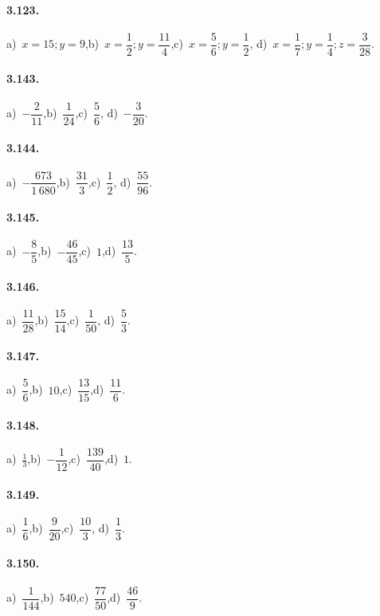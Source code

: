 \begin{multicols}{2}
\paragraph{3.123.}
a)~$x=15; y=9$,\quad b)~$x=\dfrac{1}{2}; y=\dfrac{11}{4}$,\quad c)~$x=\dfrac{5}{6}; %
y=\dfrac{1}{2}$,\quad %
d)~$x=\dfrac{1}{7}; y=\dfrac{1}{4}; z=\dfrac{3}{28}$.

\paragraph{3.143.}
a)~$-\dfrac{2}{11}$,\quad b)~$\dfrac{1}{24}$,\quad c)~$\dfrac{5}{6}$,%
\quad d)~$-\dfrac{3}{20}$.

\paragraph{3.144.}
a)~$-\dfrac{673}{1\,680}$,\quad b)~$\dfrac{31}{3}$,\quad c)~$\dfrac{1}{2}$,%
\quad d)~$\dfrac{55}{96}$.

\paragraph{3.145.}
a)~$-\dfrac{8}{5}$,\quad b)~$-\dfrac{46}{45}$,\quad c)~$1$,\quad d)~$\dfrac{13}{5}$.

\paragraph{3.146.}
a)~$\dfrac{11}{28}$,\quad b)~$\dfrac{15}{14}$,\quad c)~$\dfrac{1}{50}$,\quad %
d)~$\dfrac{5}{3}$.

\paragraph{3.147.}
a)~$\dfrac{5}{6}$,\quad b)~$10$,\quad c)~$\dfrac{13}{15}$,\quad d)~$\dfrac{11}{6}$.

\paragraph{3.148.}
a)~$\frac{1}{3}$,\quad b)~$-\dfrac{1}{12}$,\quad c)~$\dfrac{139}{40}$,\quad d)~$1$.

\paragraph{3.149.}
a)~$\dfrac{1}{6}$,\quad b)~$\dfrac{9}{20}$,\quad c)~$\dfrac{10}{3}$,\quad %
d)~$\dfrac{1}{3}$.

\paragraph{3.150.}
a)~$\dfrac{1}{144}$,\quad b)~$540$,\quad c)~$\dfrac{77}{50}$,\quad d)~$\dfrac{46}{9}$.


\end{multicols}
